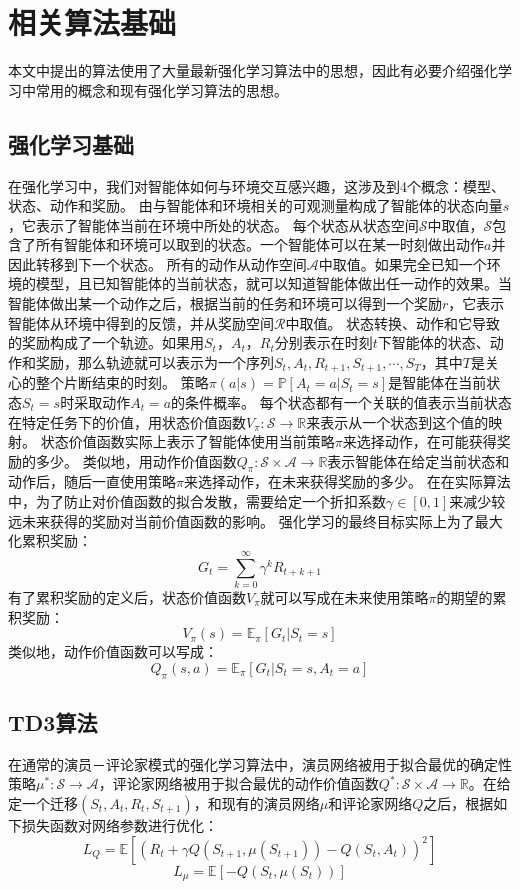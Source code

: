\chapter{相关算法基础}
   本文中提出的算法使用了大量最新强化学习算法中的思想，因此有必要介绍强化学习中常用的概念和现有强化学习算法的思想。

    \section{强化学习基础}
    在强化学习中，我们对智能体如何与环境交互感兴趣，这涉及到4个概念：模型、状态、动作和奖励\cite{sutton1988reinforcement}。
    由与智能体和环境相关的可观测量构成了智能体的状态向量$s$，它表示了智能体当前在环境中所处的状态。
    每个状态从状态空间$\mathcal S$中取值，$\mathcal S$包含了所有智能体和环境可以取到的状态。一个智能体可以在某一时刻做出动作$a$并因此转移到下一个状态。
    所有的动作从动作空间$\mathcal A$中取值。如果完全已知一个环境的模型，且已知智能体的当前状态，就可以知道智能体做出任一动作的效果。当智能体做出某一个动作之后，根据当前的任务和环境可以得到一个奖励$r$，它表示智能体从环境中得到的反馈，并从奖励空间$\mathcal R$中取值。
    状态转换、动作和它导致的奖励构成了一个轨迹。如果用$S_t$，$A_t$，$R_t$分别表示在时刻$t$下智能体的状态、动作和奖励，那么轨迹就可以表示为一个序列$S_t,A_t,R_{t+1},S_{t+1},\cdots,S_T$，其中$T$是关心的整个片断结束的时刻。
    策略$\pi(a|s)=\mathbb P[A_t=a|S_t=s]$是智能体在当前状态$S_t=s$时采取动作$A_t=a$的条件概率。
    每个状态都有一个关联的值表示当前状态在特定任务下的价值，用状态价值函数$V_\pi:\mathcal S\to\mathbb R$来表示从一个状态到这个值的映射。
    状态价值函数实际上表示了智能体使用当前策略$\pi$来选择动作，在可能获得奖励的多少。
    类似地，用动作价值函数$Q_\pi:\mathcal S\times\mathcal A\to\mathbb R$表示智能体在给定当前状态和动作后，随后一直使用策略$\pi$来选择动作，在未来获得奖励的多少。
    在在实际算法中，为了防止对价值函数的拟合发散，需要给定一个折扣系数$\gamma\in[0,1]$来减少较远未来获得的奖励对当前价值函数的影响。
    强化学习的最终目标实际上为了最大化累积奖励：
    $$G_t=\sum_{k=0}^\infty \gamma^k R_{t+k+1}$$
    有了累积奖励的定义后，状态价值函数$V_\pi$就可以写成在未来使用策略$\pi$的期望的累积奖励：
    $$V_\pi(s)=\mathbb E_\pi[G_t|S_t=s]$$
    类似地，动作价值函数可以写成：
    $$Q_\pi(s,a)=\mathbb E_\pi[G_t|S_t=s,A_t=a]$$

    \section{TD3算法}\label{td3sec}
    在通常的演员－评论家模式的强化学习算法中\cite{konda2002actor}，演员网络被用于拟合最优的确定性策略$\mu^*:\mathcal S\to\mathcal A$，评论家网络被用于拟合最优的动作价值函数$Q^*:\mathcal S\times \mathcal A\to \mathbb R$。在给定一个迁移$(S_t,A_t,R_t,S_{t+1})$，和现有的演员网络$\mu$和评论家网络$Q$之后，根据如下损失函数对网络参数进行优化：
    $$L_Q = \mathbb E[(R_t + \gamma Q(S_{t+1},\mu(S_{t+1})) - Q(S_t, A_t))^2]$$
    $$L_\mu = \mathbb E[-Q(S_t, \mu(S_t))]$$

